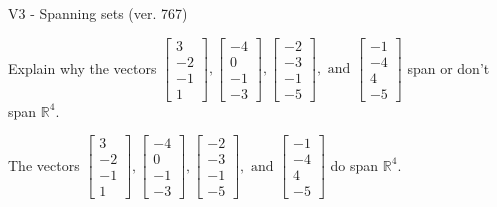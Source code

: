 \begin{exercise}
  \begin{exerciseTitle}V3 - Spanning sets (ver. 767)\end{exerciseTitle}
  \begin{exerciseStatement}
    Explain why the vectors \(\left[\begin{array}{r}
3 \\
-2 \\
-1 \\
1
\end{array}\right] , \left[\begin{array}{r}
-4 \\
0 \\
-1 \\
-3
\end{array}\right] , \left[\begin{array}{r}
-2 \\
-3 \\
-1 \\
-5
\end{array}\right] , \text{ and } \left[\begin{array}{r}
-1 \\
-4 \\
4 \\
-5
\end{array}\right]\) span or don't span \(\mathbb{R}^4\). 
	


  \end{exerciseStatement}
  \begin{exerciseAnswer}
   The vectors \(\left[\begin{array}{r}
3 \\
-2 \\
-1 \\
1
\end{array}\right] , \left[\begin{array}{r}
-4 \\
0 \\
-1 \\
-3
\end{array}\right] , \left[\begin{array}{r}
-2 \\
-3 \\
-1 \\
-5
\end{array}\right] , \text{ and } \left[\begin{array}{r}
-1 \\
-4 \\
4 \\
-5
\end{array}\right]\) 
  	 do  
	span \(\mathbb{R}^4\).
  


  \end{exerciseAnswer}
\end{exercise}